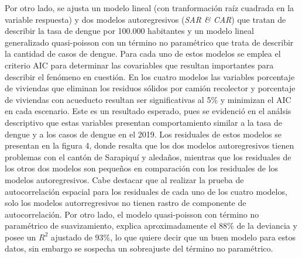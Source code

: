 \documentclass[12pt,a4paper]{article}
\begin{document}
Por otro lado, se ajusta un modelo lineal (con tranformación raíz cuadrada en la variable respuesta) y dos modelos autoregresivos (\textit{SAR \& CAR}) que tratan de describir la tasa de dengue por 100.000 habitantes y un modelo lineal generalizado quasi-poisson con un término no paramétrico que trata de describir la cantidad de casos de dengue. Para cada uno de estos modelos se emplea el criterio AIC para determinar las covariables que resultan importantes para describir el fenómeno en cuestión. En los cuatro modelos las variables porcentaje de viviendas que eliminan los residuos sólidos por camión recolector y porcentaje de viviendas con acueducto resultan ser significativas al 5\% y minimizan el AIC en cada escenario. Este es un resultado esperado, pues se evidenció en el análsis descriptivo que estas variables presentan comportamiento similar a la tasa de dengue y a los casos de dengue en el 2019.
\newline
Los residuales de estos modelos se presentan en la figura 4, donde resalta que los dos modelos autoregresivos tienen problemas con el cantón de Sarapiquí y aledaños, mientras que los residuales de los  otros dos modelos son pequeños en comparación con los residuales de los modelos autoregresivos. Cabe destacar que al realizar la prueba de autocorrelación espacial para los residuales de cada uno de los cuatro modelos, solo los modelos autorregresivos no tienen rastro de componente de autocorrelación. Por otro lado, el modelo quasi-poisson con término no paramétrico de suavizamiento, explica aproximadamente el 88\% de la deviancia y posee un $R^{2}$ ajustado de 93\%, lo que quiere decir que un buen modelo para estos datos, sin embargo se sospecha un sobreajuste del término no paramétrico.
\end{document}
